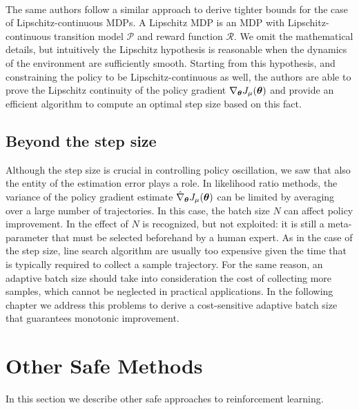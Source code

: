 \paragraph{} %
The same authors \cite{pirotta2015policy} follow a similar approach to derive tighter bounds for the case of Lipschitz-continuous \ac{MDP}s. A Lipschitz \ac{MDP} is an \ac{MDP} with Lipschitz-continuous transition model $\mathcal{P}$ and reward function $\mathcal{R}$. We omit the mathematical details, but intuitively the Lipschitz hypothesis is reasonable when the dynamics of the environment are sufficiently smooth. Starting from this hypothesis, and constraining the policy to be Lipschitz-continuous as well, the authors are able to prove the Lipschitz continuity of the policy gradient $\nabla_{\boldsymbol{\theta}}J_\mu(\boldsymbol{\theta})$ and provide an efficient algorithm to compute an optimal step size based on this fact.
 
\subsection{Beyond the step size}\label{sec:beyond}
Although the step size is crucial in controlling policy oscillation, we saw that also the entity of the estimation error plays a role. In likelihood ratio methods, the variance of the policy gradient estimate $\hat{\nabla}_{\boldsymbol{\theta}}J_{\mu}(\boldsymbol{\theta})$ can be limited by averaging over a large number of trajectories. In this case, the batch size $N$ can affect policy improvement. In \cite{NIPS2013_5186} the effect of $N$ is recognized, but not exploited: it is still a meta-parameter that must be selected beforehand by a human expert. As in the case of the step size, line search algorithm are usually too expensive given the time that is typically required to collect a sample trajectory. For the same reason, an adaptive batch size should take into consideration the cost of collecting more samples, which cannot be neglected in practical applications. In the following chapter we address this problems to derive a cost-sensitive adaptive batch size that guarantees monotonic improvement.



\section{Other Safe Methods}\label{sec:other_safe}
In this section we describe other safe approaches to reinforcement learning.


